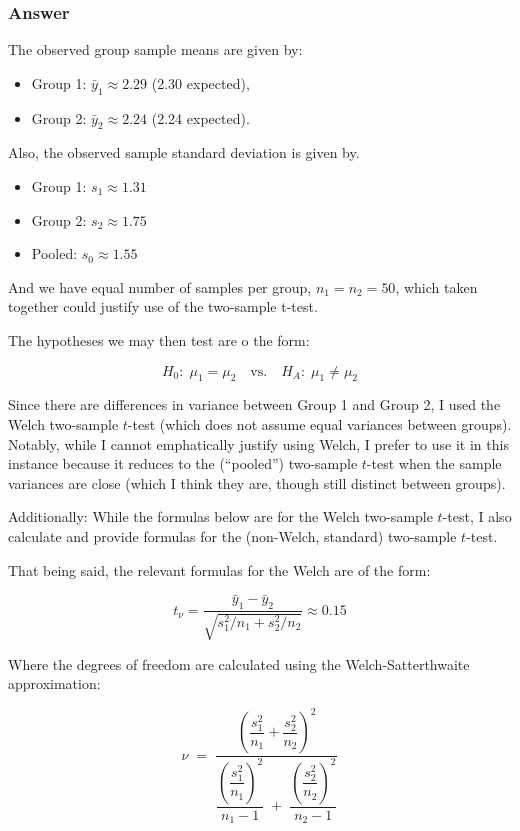 \documentclass[
]{article}
\begin{document}
\subsubsection{Answer}\label{answer-4}

The observed group sample means are given by:

\begin{itemize}
\item
  Group 1: \(\bar y_1 \approx 2.29\) (2.30 expected),
\item
  Group 2: \(\bar y_2 \approx 2.24\) (2.24 expected).
\end{itemize}

Also, the observed sample standard deviation is given by.

\begin{itemize}
\item
  Group 1: \(s_1 \approx 1.31\)
\item
  Group 2: \(s_2 \approx 1.75\)
\item
  Pooled: \(s_0 \approx 1.55\)
\end{itemize}

And we have equal number of samples per group, \(n_1=n_2=50\), which
taken together could justify use of the two-sample t-test.

The hypotheses we may then test are o the form:

\[
H_0:\; \mu_1=\mu_2 \quad\text{vs.}\quad H_A:\; \mu_1\ne \mu_2
\]

Since there are differences in variance between Group 1 and Group 2, I
used the Welch two-sample \(t\)-test (which does not assume equal
variances between groups). Notably, while I cannot emphatically justify
using Welch, I prefer to use it in this instance because it reduces to
the (``pooled'') two-sample \(t\)-test when the sample variances are
close (which I think they are, though still distinct between groups).

Additionally: While the formulas below are for the Welch two-sample
\(t\)-test, I also calculate and provide formulas for the (non-Welch,
standard) two-sample \(t\)-test.

That being said, the relevant formulas for the Welch are of the form:

\[
t_{\nu} = \frac{\bar y_1-\bar y_2}{\sqrt{s_1^2/n_1 + s_2^2/n_2}} \approx 0.15
\]

Where the degrees of freedom are calculated using the
Welch-Satterthwaite approximation:

\[
\nu \;=\; 
\frac{\left(\dfrac{s_1^2}{n_1} + \dfrac{s_2^2}{n_2}\right)^{2}}
{\dfrac{\left(\dfrac{s_1^2}{n_1}\right)^{2}}{n_1 - 1} \;+\; \dfrac{\left(\dfrac{s_2^2}{n_2}\right)^{2}}{n_2 - 1}}
\]
\end{document}
